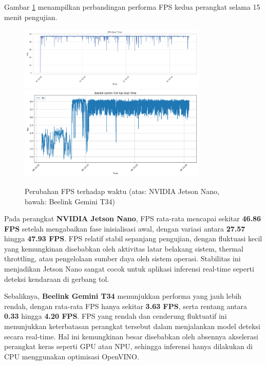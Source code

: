 Gambar \ref{fig:fps_over_time} menampilkan perbandingan performa FPS kedua perangkat selama 15 menit pengujian. 

\begin{figure}[htbp]
  \centering
  \includegraphics[width=0.8\textwidth]{gambar/bab4-jetson-fps-over-time.png}
  \includegraphics[width=0.8\textwidth]{gambar/bab4-beelink-fps-over-time.png}
  \caption{\centering Perubahan FPS terhadap waktu (atas: NVIDIA Jetson Nano, bawah: Beelink Gemini T34)}
  \label{fig:fps_over_time}
\end{figure}

Pada perangkat \textbf{NVIDIA Jetson Nano}, FPS rata-rata mencapai sekitar \textbf{46.86 FPS} setelah mengabaikan fase inisialisasi awal, dengan variasi antara \textbf{27.57} hingga \textbf{47.93 FPS}. FPS relatif stabil sepanjang pengujian, dengan fluktuasi kecil yang kemungkinan disebabkan oleh aktivitas latar belakang sistem, thermal throttling, atau pengelolaan sumber daya oleh sistem operasi. Stabilitas ini menjadikan Jetson Nano sangat cocok untuk aplikasi inferensi real-time seperti deteksi kendaraan di gerbang tol.

Sebaliknya, \textbf{Beelink Gemini T34} menunjukkan performa yang jauh lebih rendah, dengan rata-rata FPS hanya sekitar \textbf{3.63 FPS}, serta rentang antara \textbf{0.33} hingga \textbf{4.20 FPS}. FPS yang rendah dan cenderung fluktuatif ini menunjukkan keterbatasan perangkat tersebut dalam menjalankan model deteksi secara real-time. Hal ini kemungkinan besar disebabkan oleh absennya akselerasi perangkat keras seperti GPU atau NPU, sehingga inferensi hanya dilakukan di CPU menggunakan optimisasi OpenVINO.

